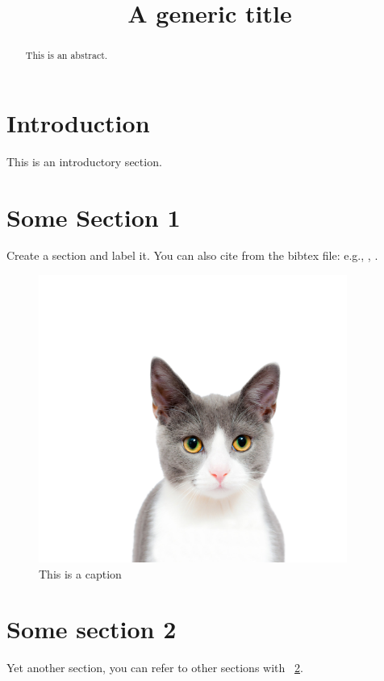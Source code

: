 \documentclass[conference]{IEEEtran}
\begin{document}
\title{A generic title}

\author{
}

\maketitle

\begin{abstract}
  This is an abstract.
\end{abstract}

\section{Introduction}

This is an introductory section.

\section{Some Section 1}
\label{sec:section1}

Create a section and label it. You can also cite from the bibtex file: e.g.,
\cite{CaterSteel2006}, \cite{Abrahamsson2002}.

\begin{figure}
	\centering
  \includegraphics[width=0.9\textwidth]{template-pic}
	\caption{This is a caption}
	\label{fig:template-picture}
\end{figure}

\section{Some section 2}
\label{sec:section2}

Yet another section, you can refer to other sections with ~\ref{sec:section1}.



\end{document}
